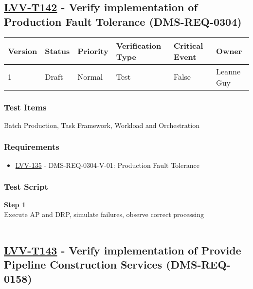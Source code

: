 \hypertarget{lvv-t142---verify-implementation-of-production-fault-tolerance-dms-req-0304}{%
\subsection{\texorpdfstring{\href{https://jira.lsstcorp.org/secure/Tests.jspa\#/testCase/LVV-T142}{LVV-T142}
- Verify implementation of Production Fault Tolerance
(DMS-REQ-0304)}{LVV-T142 - Verify implementation of Production Fault Tolerance (DMS-REQ-0304)}}\label{lvv-t142---verify-implementation-of-production-fault-tolerance-dms-req-0304}}

\begin{longtable}[]{@{}llllll@{}}
\toprule
Version & Status & Priority & Verification Type & Critical Event &
Owner\tabularnewline
\midrule
\endhead
1 & Draft & Normal & Test & False & Leanne Guy\tabularnewline
\bottomrule
\end{longtable}

\hypertarget{test-items-118}{%
\subsubsection{Test Items}\label{test-items-118}}

Batch Production, Task Framework, Workload and Orchestration~

\hypertarget{requirements-119}{%
\subsubsection{Requirements}\label{requirements-119}}

\begin{itemize}
\tightlist
\item
  \href{https://jira.lsstcorp.org/browse/LVV-135}{LVV-135} -
  DMS-REQ-0304-V-01: Production Fault Tolerance
\end{itemize}

\hypertarget{test-script-119}{%
\subsubsection{Test Script}\label{test-script-119}}

\textbf{Step 1}\\
Execute AP and DRP, simulate failures, observe correct processing\\
~\\

\hypertarget{lvv-t143---verify-implementation-of-provide-pipeline-construction-services-dms-req-0158}{%
\subsection{\texorpdfstring{\href{https://jira.lsstcorp.org/secure/Tests.jspa\#/testCase/LVV-T143}{LVV-T143}
- Verify implementation of Provide Pipeline Construction Services
(DMS-REQ-0158)}{LVV-T143 - Verify implementation of Provide Pipeline Construction Services (DMS-REQ-0158)}}\label{lvv-t143---verify-implementation-of-provide-pipeline-construction-services-dms-req-0158}}

